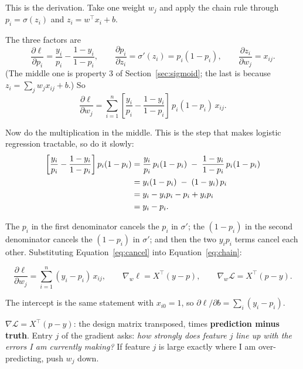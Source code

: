 \documentclass[11pt]{article}
\begin{document}
This is the derivation. Take one weight $w_j$ and apply the chain rule through
$p_i = \sigma(z_i)$ and $z_i = w^{\!\top}x_i + b$.

The three factors are
\[
  \frac{\partial \ell}{\partial p_i}
    = \frac{y_i}{p_i} - \frac{1 - y_i}{1 - p_i},
  \qquad
  \frac{\partial p_i}{\partial z_i} = \sigma'(z_i) = p_i(1 - p_i),
  \qquad
  \frac{\partial z_i}{\partial w_j} = x_{ij}.
\]
(The middle one is property 3 of Section~\ref{sec:sigmoid}; the last is
because $z_i = \sum_j w_j x_{ij} + b$.) So
\begin{equation}
  \frac{\partial \ell}{\partial w_j}
  = \sum_{i=1}^{n}
    \left[\frac{y_i}{p_i} - \frac{1-y_i}{1-p_i}\right]
    \, p_i(1-p_i)\, x_{ij}.
  \label{eq:chain}
\end{equation}

Now do the multiplication in the middle. This is the step that makes logistic
regression tractable, so do it slowly:
\begin{align}
  \left[\frac{y_i}{p_i} - \frac{1-y_i}{1-p_i}\right] p_i(1-p_i)
  &= \frac{y_i}{p_i}\,p_i(1-p_i) \;-\; \frac{1-y_i}{1-p_i}\,p_i(1-p_i)
     \notag\\
  &= y_i(1 - p_i) \;-\; (1 - y_i)\,p_i \notag\\
  &= y_i - y_i p_i - p_i + y_i p_i \notag\\
  &= y_i - p_i .
  \label{eq:cancel}
\end{align}

The $p_i$ in the first denominator cancels the $p_i$ in $\sigma'$; the
$(1-p_i)$ in the second denominator cancels the $(1-p_i)$ in $\sigma'$; and
then the two $y_ip_i$ terms cancel each other. Substituting
Equation~\eqref{eq:cancel} into Equation~\eqref{eq:chain}:

\begin{equation}
  \boxed{\;
  \frac{\partial \ell}{\partial w_j} = \sum_{i=1}^{n} (y_i - p_i)\,x_{ij},
  \qquad
  \nabla_w \ell = X^{\!\top}(y - p),
  \qquad
  \nabla_w \mathcal{L} = X^{\!\top}(p - y).
  \;}
  \label{eq:grad}
\end{equation}

The intercept is the same statement with $x_{i0} = 1$, so
$\partial\ell/\partial b = \sum_i (y_i - p_i)$.

\begin{keyidea}
$\nabla \mathcal{L} = X^{\!\top}(p - y)$: the design matrix transposed, times
\textbf{prediction minus truth}. Entry $j$ of the gradient asks: \emph{how
strongly does feature $j$ line up with the errors I am currently making?} If
feature $j$ is large exactly where I am over-predicting, push $w_j$ down.
\end{keyidea}
\end{document}
